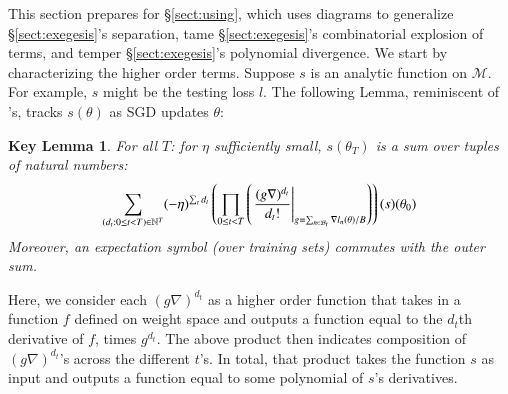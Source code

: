 \documentclass[anon,12pt]{colt2021} %
\newtheorem*{klem*}{Key Lemma}
\newcommand{\wrap}[1]{\left(#1\right)}
\newcommand{\Bb}{\mathcal{B}}
\newcommand{\Mm}{\mathcal{M}}
\begin{document}
            This section prepares for \S\ref{sect:using}, which uses
            diagrams to generalize \S\ref{sect:exegesis}'s separation, tame
            \S\ref{sect:exegesis}'s combinatorial explosion of terms, and
            temper \S\ref{sect:exegesis}'s polynomial divergence.  
            We start by characterizing the higher order terms.  Suppose
            $s$ is an analytic function on $\Mm$.  For example, $s$ might be
            the testing loss $l$.  The following Lemma, reminiscent of
            \cite{dy49a}'s, tracks $s(\theta)$ as SGD updates $\theta$:
            \begin{klem*} \label{lem:dyson}
                For all $T$: for $\eta$ sufficiently small, $s(\theta_T)$ is a
                sum over tuples of natural numbers:
                \begin{equation}\label{eq:dyson}
                    \sum_{(d_t: 0\leq t<T) \in \NN^T}
                    (-\eta)^{\sum_t d_t}
                    \wrap{
                        \prod_{0 \leq t < T}
                            \wrap{\left.
                                \frac{(g \nabla)^{d_t}}{d_t!}
                            \right|_{g = \sum_{n\in \Bb_t} \nabla l_n(\theta) / B}}
                    }(s) (\theta_0)
                \end{equation}
                Moreover, an expectation symbol (over training sets) commutes
                with the outer sum.
            \end{klem*}
            Here, we consider each $(g \nabla)^{d_t}$ as a higher order
            function that takes in a function $f$ defined on weight space and
            outputs a function equal to the $d_t$th derivative of $f$, times
            $g^{d_t}$.  The above product then indicates composition of $(g
            \nabla)^{d_t}$'s across the different $t$'s.  In total, that
            product takes the function $s$ as input and outputs a function
            equal to some polynomial of $s$'s derivatives.
\end{document}
